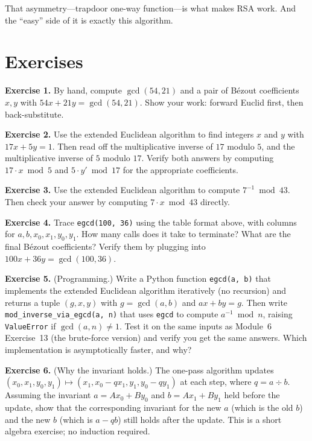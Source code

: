 \documentclass[11pt]{article}
\begin{document}
That asymmetry---trapdoor one-way function---is what makes RSA work. And the ``easy'' side of it is exactly this algorithm.

\section{Exercises}

\textbf{Exercise 1.}\label{ex:eea:1} By hand, compute $\gcd(54, 21)$ and a pair of B\'ezout coefficients $x, y$ with $54 x + 21 y = \gcd(54, 21)$. Show your work: forward Euclid first, then back-substitute.

\bigskip
\noindent\textbf{Exercise 2.}\label{ex:eea:2} Use the extended Euclidean algorithm to find integers $x$ and $y$ with $17 x + 5 y = 1$. Then read off the multiplicative inverse of $17$ modulo $5$, and the multiplicative inverse of $5$ modulo $17$. Verify both answers by computing $17 \cdot x \bmod 5$ and $5 \cdot y' \bmod 17$ for the appropriate coefficients.

\bigskip
\noindent\textbf{Exercise 3.}\label{ex:eea:3} Use the extended Euclidean algorithm to compute $7^{-1} \bmod 43$. Then check your answer by computing $7 \cdot x \bmod 43$ directly.

\bigskip
\noindent\textbf{Exercise 4.}\label{ex:eea:4} Trace \texttt{egcd(100, 36)} using the table format above, with columns for $a, b, x_0, x_1, y_0, y_1$. How many calls does it take to terminate? What are the final B\'ezout coefficients? Verify them by plugging into $100 x + 36 y = \gcd(100, 36)$.

\bigskip
\noindent\textbf{Exercise 5.}\label{ex:eea:5} (Programming.) Write a Python function \texttt{egcd(a, b)} that implements the extended Euclidean algorithm iteratively (no recursion) and returns a tuple $(g, x, y)$ with $g = \gcd(a, b)$ and $a x + b y = g$. Then write \texttt{mod\_inverse\_via\_egcd(a, n)} that uses \texttt{egcd} to compute $a^{-1} \bmod n$, raising \texttt{ValueError} if $\gcd(a, n) \neq 1$. Test it on the same inputs as Module~6 Exercise~13 (the brute-force version) and verify you get the same answers. Which implementation is asymptotically faster, and why?

\bigskip
\noindent\textbf{Exercise 6.}\label{ex:eea:6} (Why the invariant holds.) The one-pass algorithm updates $(x_0, x_1, y_0, y_1) \mapsto (x_1, x_0 - q x_1, y_1, y_0 - q y_1)$ at each step, where $q = a \div b$. Assuming the invariant $a = A x_0 + B y_0$ and $b = A x_1 + B y_1$ held before the update, show that the corresponding invariant for the new $a$ (which is the old $b$) and the new $b$ (which is $a - q b$) still holds after the update. This is a short algebra exercise; no induction required.
\end{document}
